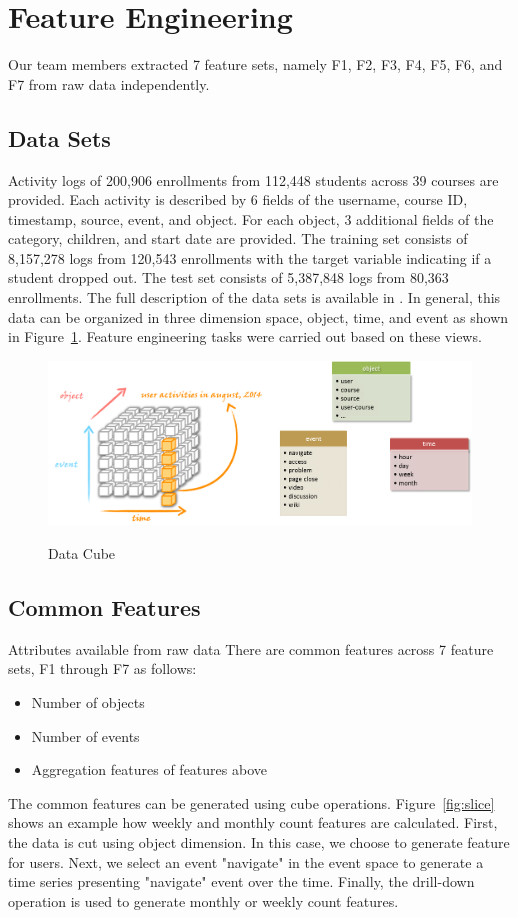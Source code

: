 \section{Feature Engineering}
Our team members extracted 7 feature sets, namely F1, F2, F3, F4, F5, F6, and F7 from raw data independently.

\subsection{Data Sets}
Activity logs of 200,906 enrollments from 112,448 students across 39 courses are provided.
Each activity is described by 6 fields of the username, course ID, timestamp, source, event, and object. 
For each object, 3 additional fields of the category, children, and start date are provided.
The training set consists of 8,157,278 logs from 120,543 enrollments with the target variable indicating if a student dropped out.  
The test set consists of 5,387,848 logs from 80,363 enrollments.
The full description of the data sets is available in \cite{kddcup2015_data}. In general, this data can be organized in three dimension space, object, time, and event as shown in Figure~\ref{fig:cube}. Feature engineering tasks were carried out based on these views.

\begin{figure}[!t]
	\caption{Data Cube}
	\centering
	\includegraphics[width=0.5 \textwidth]{cube}
	\label{fig:cube}
\end{figure}


\subsection{Common Features}
Attributes available from raw data
There are common features across 7 feature sets, F1 through F7 as follows:
\begin{itemize}
	\item Number of objects
	\item Number of events
	\item Aggregation features of features above
\end{itemize}
The common features can be generated using cube operations. Figure~\ref{fig:slice} shows an example how weekly and monthly count features are calculated. First, the data is cut using object dimension. In this case, we choose to generate feature for users. Next, we select an event "navigate" in the event space to generate a time series presenting "navigate" event over the time. Finally, the drill-down operation is used to generate monthly or weekly count features.

